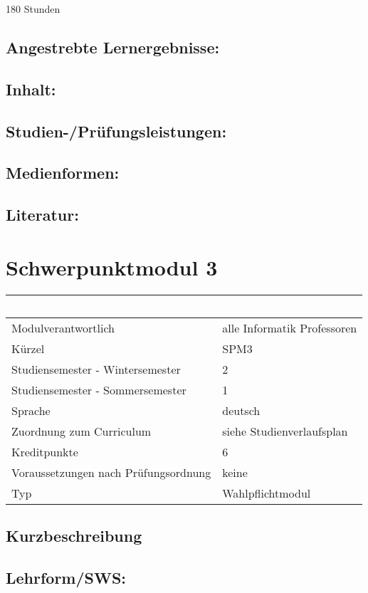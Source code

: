 180 Stunden

\section*{Angestrebte
Lernergebnisse:}\label{angestrebte-lernergebnisse-4}

\section*{Inhalt:}\label{inhalt-4}

\section*{Studien-/Prüfungsleistungen:}\label{studien-pruxfcfungsleistungen-4}

\section*{Medienformen:}\label{medienformen-4}

\section*{Literatur:}\label{literatur-4}

\chapter{Schwerpunktmodul 3}\label{schwerpunktmodul-3}

\begin{longtable}[]{@{}ll@{}}
\toprule
~ & ~\tabularnewline
\midrule
\endhead
Modulverantwortlich & alle Informatik Professoren\tabularnewline
Kürzel & SPM3\tabularnewline
Studiensemester - Wintersemester & 2\tabularnewline
Studiensemester - Sommersemester & 1\tabularnewline
Sprache & deutsch\tabularnewline
Zuordnung zum Curriculum & siehe Studienverlaufsplan\tabularnewline
Kreditpunkte & 6\tabularnewline
Voraussetzungen nach Prüfungsordnung & keine\tabularnewline
Typ & Wahlpflichtmodul\tabularnewline
\bottomrule
\end{longtable}

\section*{Kurzbeschreibung}\label{kurzbeschreibung-4}

\section*{Lehrform/SWS:}\label{lehrformsws-5}

